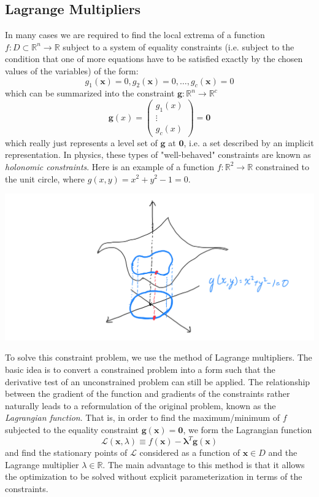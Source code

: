 \documentclass{article}
\theoremstyle{remark}
\theoremstyle{definition}
\begin{document}
\subsection{Lagrange Multipliers}

In many cases we are required to find the local extrema of a function $f: D \subset \mathbb{R}^n \longrightarrow \mathbb{R}$ subject to a system of equality constraints (i.e. subject to the condition that one of more equations have to be satisfied exactly by the chosen values of the variables) of the form: 
\[g_1 (\mathbf{x}) = 0, g_2 (\mathbf{x}) = 0, \ldots, g_c (\mathbf{x}) = 0 \]
which can be summarized into the constraint $\mathbf{g}: \mathbb{R}^n \longrightarrow \mathbb{R}^c$
\[\mathbf{g}(x) = \begin{pmatrix}
g_1 (x) \\ \vdots \\ g_c (x)
\end{pmatrix} = \mathbf{0}\]
which really just represents a level set of $\mathbf{g}$ at $\mathbf{0}$, i.e. a set described by an implicit representation. In physics, these types of "well-behaved" constraints are known as \textit{holonomic constraints}. Here is an example of a function $f: \mathbb{R}^2 \longrightarrow \mathbb{R}$ constrained to the unit circle, where $g(x, y) = x^2 + y^2 - 1= 0 $.
\begin{center}
    \includegraphics[scale=0.2]{img/Function_with_Constraints.PNG}
\end{center}
To solve this constraint problem, we use the method of Lagrange multipliers. The basic idea is to convert a constrained problem into a form such that the derivative test of an unconstrained problem can still be applied. The relationship between the gradient of the function and gradients of the constraints rather naturally leads to a reformulation of the original problem, known as the \textit{Lagrangian function}. That is, in order to find the maximum/minimum of $f$ subjected to the equality constraint $\mathbf{g}(\mathbf{x}) = \mathbf{0}$, we form the Lagrangian function
\[\mathcal{L}(\mathbf{x}, \lambda) \equiv f(\mathbf{x}) - \boldsymbol{\lambda}^T \mathbf{g}(\mathbf{x})\]
and find the stationary points of $\mathcal{L}$ considered as a function of $\mathbf{x} \in D$ and the Lagrange multiplier $\lambda \in \mathbb{R}$. The main advantage to this method is that it allows the optimization to be solved without explicit parameterization in terms of the constraints. 
\end{document}
